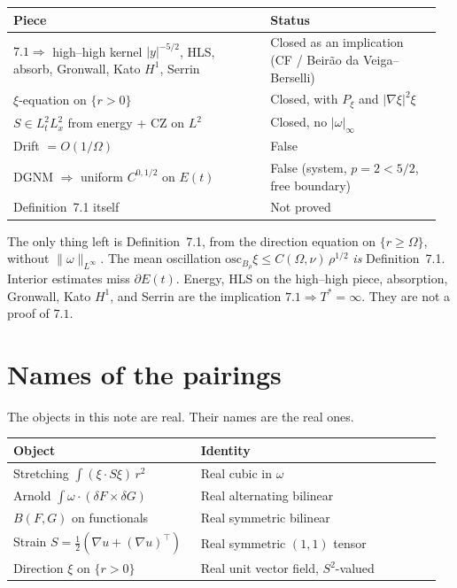 \documentclass[11pt,a4paper]{article}
\theoremstyle{definition}
\theoremstyle{remark}
\newcommand{\abs}[1]{\lvert#1\rvert}
\newcommand{\norm}[1]{\lVert#1\rVert}
\begin{document}
\begin{center}
\small
\begin{tabular}{@{}p{0.58\linewidth}p{0.38\linewidth}@{}}
\hline
Piece & Status \\
\hline
\(7.1\Rightarrow\) high--high kernel \(\abs{y}^{-5/2}\), HLS, absorb,
Gronwall, Kato \(H^1\), Serrin
& Closed as an implication (CF / Beir\~ao da Veiga--Berselli) \\[4pt]
\(\xi\)-equation on \(\{r>0\}\)
& Closed, with \(P_\xi\) and \(\abs{\nabla\xi}^2\xi\) \\[4pt]
\(S\in L^2_t L^2_x\) from energy + CZ on \(L^2\)
& Closed, no \(\abs{\omega}_\infty\) \\[4pt]
Drift \(=O(1/\Omega)\)
& False \\[4pt]
DGNM \(\Rightarrow\) uniform \(C^{0,1/2}\) on \(E(t)\)
& False (system, \(p=2<5/2\), free boundary) \\[4pt]
Definition~7.1 itself
& Not proved \\
\hline
\end{tabular}
\end{center}

The only thing left is Definition~7.1, from the direction equation
on \(\{r\ge\Omega\}\), without \(\norm{\omega}_{L^\infty}\).
The mean oscillation
\(\mathrm{osc}_{B_\rho}\xi\le C(\Omega,\nu)\,\rho^{1/2}\)
\emph{is} Definition~7.1. Interior estimates miss \(\partial E(t)\).
Energy, HLS on the high--high piece, absorption, Gronwall, Kato \(H^1\),
and Serrin are the implication \(7.1\Rightarrow T^*=\infty\). They are
not a proof of \(7.1\).

\section{Names of the pairings}
\label{sec:real-pairings}

The objects in this note are real. Their names are the real ones.

\begin{center}
\small
\begin{tabular}{@{}p{0.42\linewidth}p{0.54\linewidth}@{}}
\hline
Object & Identity \\
\hline
Stretching \(\displaystyle\int (\xi\cdot S\xi)\,r^2\)
& Real cubic in \(\omega\) \\[4pt]
Arnold \(\displaystyle\int \omega\cdot(\delta F\times\delta G)\)
& Real alternating bilinear \\[4pt]
\(B(F,G)\) on functionals
& Real symmetric bilinear \\[4pt]
Strain \(S=\tfrac12(\nabla u+(\nabla u)^\top)\)
& Real symmetric \((1,1)\) tensor \\[4pt]
Direction \(\xi\) on \(\{r>0\}\)
& Real unit vector field, \(S^2\)-valued \\
\hline
\end{tabular}
\end{center}
\end{document}
